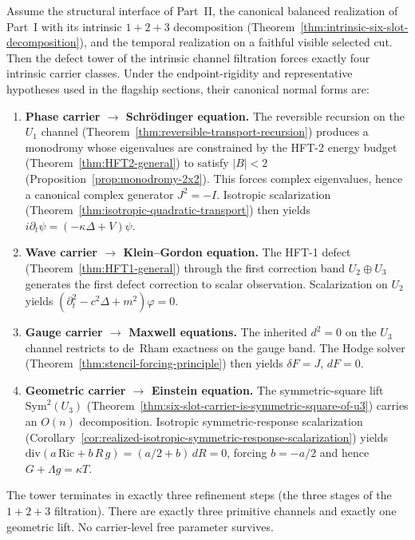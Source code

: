 \begin{theorem}
\label{thm:defect-tower-complete-carrier-forcing}
Assume the structural interface of Part~II, the canonical balanced
realization of Part~I with its intrinsic $1{+}2{+}3$ decomposition
(Theorem~\ref{thm:intrinsic-six-slot-decomposition}), and the temporal
realization on a faithful visible selected cut. Then the defect tower of the
intrinsic channel filtration forces exactly four intrinsic carrier classes.
Under the endpoint-rigidity and representative hypotheses used in the flagship
sections, their canonical normal forms are:
\begin{enumerate}[label=\textup{(\alph*)}, itemsep=0.3em]
\item \textbf{Phase carrier $\to$ Schr\"odinger equation.}
  The reversible recursion on the $U_1$ channel
  (Theorem~\ref{thm:reversible-transport-recursion}) produces a monodromy
  whose eigenvalues are constrained by the HFT-2 energy budget
  (Theorem~\ref{thm:HFT2-general}) to satisfy $|B|<2$
  (Proposition~\ref{prop:monodromy-2x2}). This forces complex eigenvalues,
  hence a canonical complex generator $J^2=-I$. Isotropic scalarization
  (Theorem~\ref{thm:isotropic-quadratic-transport}) then yields
  $i\partial_t\psi = (-\kappa\Delta + V)\psi$.
\item \textbf{Wave carrier $\to$ Klein--Gordon equation.}
  The HFT-1 defect (Theorem~\ref{thm:HFT1-general}) through the first
  correction band $U_2\oplus U_3$ generates the first defect correction to
  scalar observation. Scalarization on $U_2$ yields
  $(\partial_t^2 - c^2\Delta + m^2)\varphi = 0$.
\item \textbf{Gauge carrier $\to$ Maxwell equations.}
  The inherited $d^2=0$ on the $U_3$ channel restricts to de~Rham exactness
  on the gauge band. The Hodge solver
  (Theorem~\ref{thm:stencil-forcing-principle}) then yields
  $\delta F = J$, $dF = 0$.
\item \textbf{Geometric carrier $\to$ Einstein equation.}
  The symmetric-square lift $\mathrm{Sym}^2(U_3)$
  (Theorem~\ref{thm:six-slot-carrier-is-symmetric-square-of-u3}) carries an
  $O(n)$ decomposition. Isotropic symmetric-response scalarization
  (Corollary~\ref{cor:realized-isotropic-symmetric-response-scalarization})
  yields $\mathrm{div}(a\,\mathrm{Ric} + b\,R\,g) = (a/2+b)\,dR = 0$,
  forcing $b = -a/2$ and hence $G + \Lambda g = \kappa T$.
\end{enumerate}
The tower terminates in exactly three refinement steps (the three stages of
the $1{+}2{+}3$ filtration). There are exactly three primitive channels and
exactly one geometric lift. No carrier-level free parameter survives.
\end{theorem}

